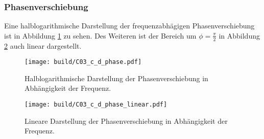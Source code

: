 \subsubsection{Phasenverschiebung}
Eine halblogarithmische Darstellung der frequenzabhägigen Phasenverschiebung ist in Abbildung  \ref{fig:plot_phase} zu sehen.
Des Weiteren ist der Bereich um $\phi = \frac{\pi}{2}$ in Abbildung \ref{fig:plot_phase_linear} auch linear dargestellt.

\begin{figure}[H]
    \centering
    \texttt{[image: build/C03\_c\_d\_phase.pdf]}
    \caption{Halblogarithmische Darstellung der Phasenverschiebung in Abhängigkeit der Frequenz.}
    \label{fig:plot_phase}
\end{figure}

\begin{figure}[H]
    \centering
    \texttt{[image: build/C03\_c\_d\_phase\_linear.pdf]}
    \caption{Lineare Darstellung der Phasenverschiebung in Abhängigkeit der Frequenz.}
    \label{fig:plot_phase_linear}
\end{figure}